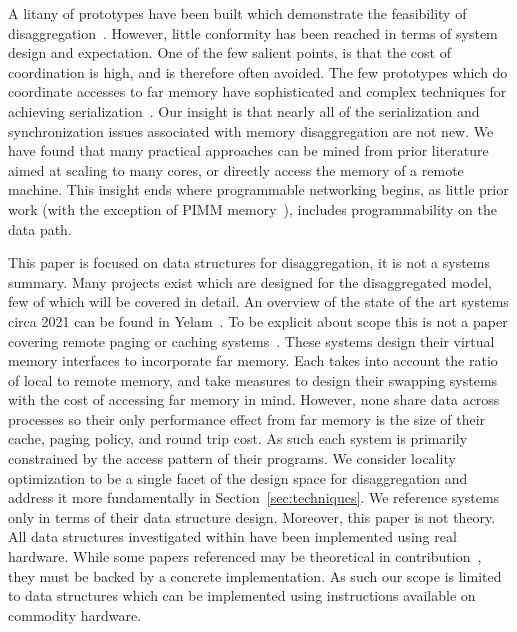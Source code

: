 
A litany of prototypes have been built which demonstrate the feasibility of
disaggregation~\cite{infiniswap,fastswap,leap,legoos,aifm,kona,reigons,software-far,lite,semeru}.
However, little conformity has been reached in terms of system design and
expectation. One of the few salient points, is that the cost of coordination is
high, and is therefore often avoided. The few prototypes which do coordinate
accesses to far memory have sophisticated and complex techniques for achieving
serialization~\cite{clover,race,sherman,ford}. Our insight is that nearly all of
the serialization and synchronization issues associated with memory
disaggregation are not new. We have found that many practical approaches can be
mined from prior literature aimed at scaling to many cores, or directly access
the memory of a remote machine. This insight ends where programmable networking
begins, as little prior work (with the exception of PIMM memory~\cite{pimm}),
includes programmability on the data path.

This paper is focused on data structures for disaggregation, it is not a systems
summary.  Many projects exist which are designed for the disaggregated model,
few of which will be covered in detail. An overview of the state of the art
systems circa 2021 can be found in Yelam~\cite{yelam2022systems}.
To be explicit about scope this is not a paper covering remote paging or caching
systems~\cite{fastswap,kona,infiniswap,leap,legoos}. These systems design their
virtual memory interfaces to incorporate far memory. Each takes into account the
ratio of local to remote memory, and take measures to design their swapping
systems with the cost of accessing far memory in mind.  However, none share data
across processes so their only performance effect from far memory is the size of
their cache, paging policy, and round trip cost. As such each system is
primarily constrained by the access pattern of their programs. We consider
locality optimization to be a single facet of the design space for
disaggregation and address it more fundamentally in
Section~\ref{sec:techniques}. We reference systems only in terms of their data
structure design.
Moreover, this paper is not theory. All data structures investigated within have been
implemented using real hardware. While some papers referenced may be theoretical
in contribution~\cite{flat-combine,hopscotch,linked-list-cas}, they must be
backed by a concrete implementation. As such our scope is limited to data
structures which can be implemented using instructions available on commodity
hardware.

